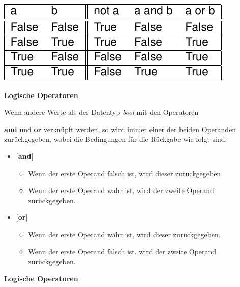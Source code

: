 \includegraphics[width=\textwidth]{img/truth_table.pdf}




\vspace{0.5cm}\par\noindent\textbf{Logische Operatoren}\vspace{0.5cm}

Wenn andere Werte als der Datentyp \emph{bool} mit den Operatoren
\vspace{0.5cm}\par\noindent\textbf{and} und \textbf{or} verknüpft werden, so wird immer einer der\vspace{0.5cm}
beiden Operanden zurückgegeben, wobei die Bedingungen für die Rückgabe
wie folgt sind:

\begin{itemize}
\itemsep1pt\parskip0pt
\item
  {{[}\textbf{and}{]}}

  \begin{itemize}
  \itemsep1pt\parskip0pt
  \item
    {Wenn der erste Operand falsch ist, wird dieser zurückgegeben.}
  \item
    {Wenn der erste Operand wahr ist, wird der zweite Operand
    zurückgegeben.}
  \end{itemize}
\item
  {{[}\textbf{or}{]}}

  \begin{itemize}
  \itemsep1pt\parskip0pt
  \item
    {Wenn der erste Operand wahr ist, wird dieser zurückgegeben.}
  \item
    {Wenn der erste Operand falsch ist, wird der zweite Operand
    zurückgegeben.}
  \end{itemize}
\end{itemize}




\vspace{0.5cm}\par\noindent\textbf{Logische Operatoren}\vspace{0.5cm}

